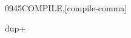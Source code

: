 \begin{worddef}{0945}{COMPILE,}[compile-comma]
	\begin{testing}\ttfamily
		  \word{+} \word{;}  dup+ \\
		 \\
		 \\
	\end{testing}
\end{worddef}


%
%
%
%
%


